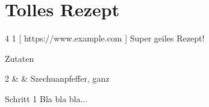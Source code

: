 \section{
  Tolles Rezept
}
\label{rcp:tolles-rezept}

\begin{recipeintro}{
4
}{
1
}[
https://www.example.com
]
Super geiles Rezept!
\end{recipeintro}

\begin{ingredients}{
  Zutaten
  }

2                &  \si{\tl}           &  Szechuanpfeffer, ganz  \\


\end{ingredients}

\vspace{0.5cm}

\begin{recipestep}{
  Schritt 1
  }
  Bla bla bla...
\end{recipestep}
